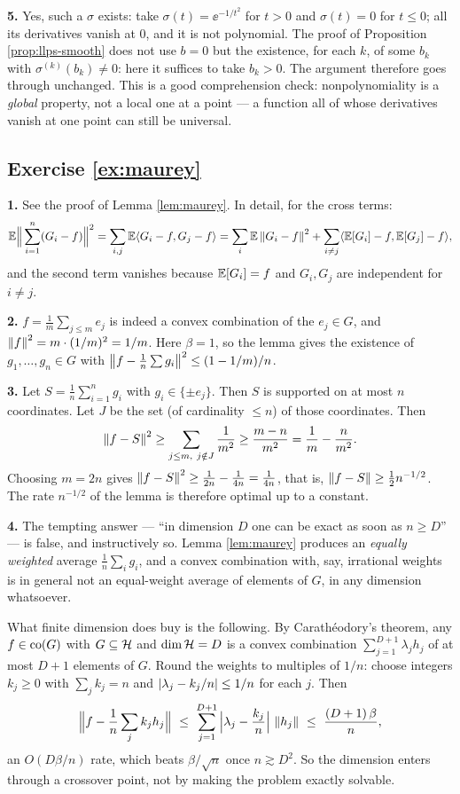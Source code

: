 \documentclass[11pt,a4paper]{article}
\begin{document}
\textbf{5.} Yes, such a $\sigma$ exists: take $\sigma(t) = \ee^{-1/t^2}$ for $t > 0$ and
$\sigma(t) = 0$ for $t \le 0$; all its derivatives vanish at $0$, and it is not polynomial. The
proof of Proposition \ref{prop:llps-smooth} does not use $b = 0$ but the existence, for each $k$, of
some $b_k$ with $\sigma^{(k)}(b_k) \ne 0$: here it suffices to take $b_k > 0$. The argument
therefore goes through unchanged. This is a good comprehension check: nonpolynomiality is a
\emph{global} property, not a local one at a point --- a function all of whose derivatives vanish at
one point can still be universal.

\subsection*{Exercise \ref{ex:maurey}}

\textbf{1.} See the proof of Lemma \ref{lem:maurey}. In detail, for the cross terms:
\[
\mathbb{E} \Big\| \sum_{i=1}^n (G_i - f)\Big\|^2
= \sum_{i,j} \mathbb{E} \langle G_i - f , G_j - f \rangle
= \sum_i \mathbb{E} \left\lVert G_i - f \right\rVert^2 + \sum_{i \ne j} \langle \mathbb{E}[G_i] - f , \mathbb{E}[G_j] - f \rangle,
\]
and the second term vanishes because $\mathbb{E}[G_i] = f$ and $G_i, G_j$ are independent for $i \ne j$.

\textbf{2.} $f = \frac1m\sum_{j\le m} e_j$ is indeed a convex combination of the $e_j \in G$, and
$\left\lVert f \right\rVert^2 = m \cdot (1/m)^2 = 1/m$. Here $\beta = 1$, so the lemma gives the existence of
$g_1,\dots,g_n \in G$ with $\left\lVert f - \frac1n\sum g_i \right\rVert^2 \le (1 - 1/m)/n$.

\textbf{3.} Let $S = \frac1n \sum_{i=1}^n g_i$ with $g_i \in \{\pm e_j\}$. Then $S$ is supported on
at most $n$ coordinates. Let $J$ be the set (of cardinality $\le n$) of those coordinates. Then
\[
\left\lVert f - S \right\rVert^2 \ge \sum_{j \le m,\ j \notin J} \frac{1}{m^2} \ge \frac{m - n}{m^2} = \frac1m - \frac{n}{m^2}.
\]
Choosing $m = 2n$ gives $\left\lVert f-S \right\rVert^2 \ge \frac{1}{2n} - \frac{1}{4n} = \frac{1}{4n}$, that is,
$\left\lVert f - S \right\rVert \ge \tfrac12 n^{-1/2}$. The rate $n^{-1/2}$ of the lemma is therefore optimal up to a
constant.

\textbf{4.} The tempting answer --- ``in dimension $D$ one can be exact as soon as $n \ge D$'' ---
is false, and instructively so. Lemma \ref{lem:maurey} produces an \emph{equally weighted} average
$\frac1n\sum_i g_i$, and a convex combination with, say, irrational weights is in general not an
equal-weight average of elements of $G$, in any dimension whatsoever.

What finite dimension does buy is the following. By Carathéodory's theorem, any $f \in \operatorname{co}(G)$ with
$G \subseteq \mathcal{H}$ and $\dim \mathcal{H} = D$ is a convex combination $\sum_{j=1}^{D+1}\lambda_j h_j$ of at
most $D+1$ elements of $G$. Round the weights to multiples of $1/n$: choose integers $k_j \ge 0$ with
$\sum_j k_j = n$ and $\left\lvert \lambda_j - k_j/n \right\rvert \le 1/n$ for each $j$. Then
\[
\Big\| f - \frac1n\sum_{j} k_j h_j \Big\|
\ \le\ \sum_{j=1}^{D+1} \Big|\lambda_j - \frac{k_j}{n}\Big|\,\left\lVert h_j \right\rVert
\ \le\ \frac{(D+1)\,\beta}{n},
\]
an $O(D\beta/n)$ rate, which beats $\beta/\sqrt n$ once $n \gtrsim D^2$. So the dimension enters
through a crossover point, not by making the problem exactly solvable.
\end{document}
